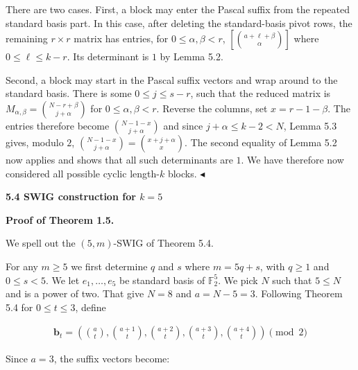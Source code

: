 There are two cases. First, a block may enter the Pascal suffix from the repeated
standard basis part. In this case, after deleting the standard-basis pivot rows, the
remaining $r\times r$ matrix has entries, for $0\leq\alpha,\beta<r$,
$\left[\binom{a+\ell+\beta}{\alpha}\right]$
where $0\leq\ell\leq k-r$. Its determinant is $1$ by
Lemma 5.2.\par




Second, a block may start in the Pascal suffix vectors and wrap around to the standard basis. There is some $0\leq j\leq s-r$, such that the reduced matrix is
$M_{\alpha,\beta}=\binom{N-r+\beta}{j+\alpha}$
for $0\leq\alpha,\beta<r$. Reverse the columns, set $x=r-1-\beta$. The entries therefore become
$\binom{N-1-x}{j+\alpha}$
and since $j+\alpha\leq k-2<N$, Lemma 5.3 gives, modulo
$2$,
$\binom{N-1-x}{j+\alpha}=\binom{x+j+\alpha}{x}.$
The second equality of Lemma 5.2 now applies and shows that all such determinants are $1$.
We have therefore now considered all possible cyclic length-$k$ blocks.
$\blacktriangleleft$\par






\par\medskip\noindent\textbf{
5.4 SWIG construction for $k=5$
}\par




\par\medskip\noindent\textbf{Proof of Theorem 1.5.}\par




We spell out the $(5,m)$-SWIG of Theorem 5.4.\par




For any $m\geq 5$ we first determine $q$ and $s$ where
$m=5q+s$, with $q\geq 1$ and $0\leq s<5$. We let
$e_{1},\ldots,e_{5}$ be standard basis of $\mathbb{F}_{2}^{5}$.
We pick $N$ such that $5\leq N$ and is a power of two. That give $N=8$ and $a=N-5=3$. Following Theorem 5.4 for
$0\leq t\leq 3$, define\par


\[\begin{gathered}
\mathbf{b}_{t}=\left(\binom{a}{t},\binom{a+1}{t},\binom{a+2}{t},\binom{a+3}{t},\binom{a+4}{t}\right)\pmod{2}
\end{gathered}\]


Since $a=3$, the suffix vectors become:\par


